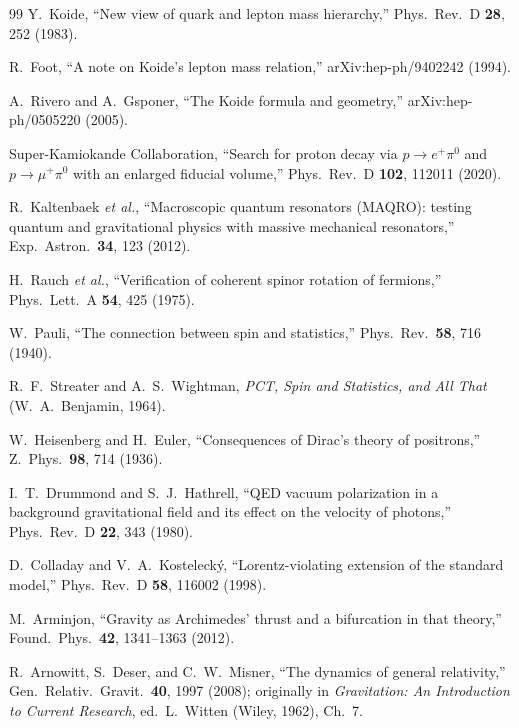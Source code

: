 \documentclass[aps,prd,onecolumn,superscriptaddress,nofootinbib,showpacs,12pt,notitlepage]{revtex4-2}
\begin{document}
\begin{thebibliography}{99}
  Y.~Koide,
  ``New view of quark and lepton mass hierarchy,''
  Phys.\ Rev.\ D \textbf{28}, 252 (1983).

  R.~Foot,
  ``A note on Koide's lepton mass relation,''
  arXiv:hep-ph/9402242 (1994).

  A.~Rivero and A.~Gsponer,
  ``The Koide formula and geometry,''
  arXiv:hep-ph/0505220 (2005).

  Super-Kamiokande Collaboration,
  ``Search for proton decay via $p \to e^{+}\pi^{0}$ and
  $p \to \mu^{+}\pi^{0}$ with an enlarged fiducial volume,''
  Phys.\ Rev.\ D \textbf{102}, 112011 (2020).

  R.~Kaltenbaek \textit{et al.},
  ``Macroscopic quantum resonators (MAQRO): testing quantum
  and gravitational physics with massive mechanical resonators,''
  Exp.\ Astron.\ \textbf{34}, 123 (2012).

  H.~Rauch \textit{et al.},
  ``Verification of coherent spinor rotation of fermions,''
  Phys.\ Lett.\ A \textbf{54}, 425 (1975).

  W.~Pauli,
  ``The connection between spin and statistics,''
  Phys.\ Rev.\ \textbf{58}, 716 (1940).

  R.~F.~Streater and A.~S.~Wightman,
  \textit{PCT, Spin and Statistics, and All That}
  (W.~A.~Benjamin, 1964).

  W.~Heisenberg and H.~Euler,
  ``Consequences of Dirac's theory of positrons,''
  Z.~Phys.\ \textbf{98}, 714 (1936).

  I.~T.~Drummond and S.~J.~Hathrell,
  ``QED vacuum polarization in a background gravitational
  field and its effect on the velocity of photons,''
  Phys.\ Rev.\ D \textbf{22}, 343 (1980).

  D.~Colladay and V.~A.~Kosteleck\'y,
  ``Lorentz-violating extension of the standard model,''
  Phys.\ Rev.\ D \textbf{58}, 116002 (1998).

  M.~Arminjon,
  ``Gravity as Archimedes' thrust and a bifurcation in that theory,''
  Found.\ Phys.\ \textbf{42}, 1341--1363 (2012).

  R.~Arnowitt, S.~Deser, and C.~W.~Misner,
  ``The dynamics of general relativity,''
  Gen.\ Relativ.\ Gravit.\ \textbf{40}, 1997 (2008);
  originally in \textit{Gravitation: An Introduction to
  Current Research}, ed.~L.~Witten (Wiley, 1962), Ch.~7.


\end{thebibliography}
\end{document}
